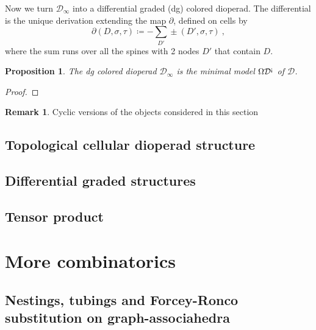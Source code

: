 \documentclass{amsart}
\newtheorem{proposition}[theorem]{Proposition}
\theoremstyle{definition}
\newtheorem{remark}[theorem]{Remark}
\newcommand{\as}{{\scriptstyle \text{\rm !`}}} %
\newcommand{\guillaume}[1]{\todo[color=orange!30]{#1 --- G.}}
\newcommand{\dioperad}{\mathcal{D}} %
\begin{document}
Now we turn $\dioperad_\infty$ into a differential graded (dg) colored dioperad. 
The differential is the unique derivation extending the map $\partial$, defined on cells by 
\[ \partial(D, \sigma, \tau) \coloneqq - \sum_{D'} \pm (D',\sigma,\tau) \ , \] 
where the sum runs over all the spines with 2 nodes $D'$ that contain $D$. 

\begin{proposition}
The dg colored dioperad $\dioperad_\infty$ is the minimal model $\Omega \dioperad^{\as}$ of $\dioperad$. 
\end{proposition}

\begin{proof} \guillaume{!!}
\end{proof}

\begin{remark} Cyclic versions of the objects considered in this section
\end{remark}


\subsection{Topological cellular dioperad structure}


\subsection{Differential graded structures}


\subsection{Tensor product}



\appendix

\section{More combinatorics}


\subsection{Nestings, tubings and Forcey-Ronco substitution on graph-associahedra}
\end{document}
